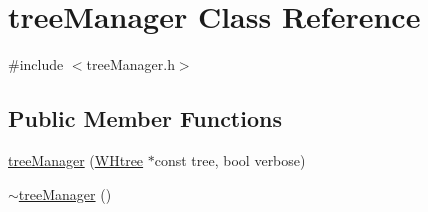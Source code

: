 \hypertarget{classtreeManager}{\section{tree\-Manager \-Class \-Reference}
\label{classtreeManager}
}


{\ttfamily \#include $<$tree\-Manager.\-h$>$}

\subsection*{\-Public \-Member \-Functions}
\begin{DoxyCompactItemize}
\item 
\hyperlink{classtreeManager_ae7fd0d73d6dd594a8eeb9dd8a4f5fb40}{tree\-Manager} (\hyperlink{classWHtree}{\-W\-Htree} $\ast$const tree, bool verbose)
\item 
\hypertarget{classtreeManager_a00514d3e3aa1df70f5e1caa695823b3e}{\hyperlink{classtreeManager_a00514d3e3aa1df70f5e1caa695823b3e}{$\sim$tree\-Manager} ()}\label{classtreeManager_a00514d3e3aa1df70f5e1caa695823b3e}


\end{DoxyCompactItemize}
